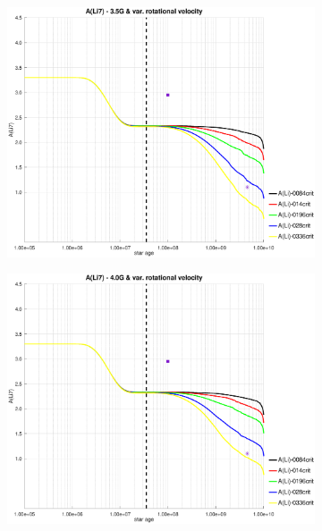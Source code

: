 \documentclass[fleqn,usenatbib]{mnras}
\begin{document}
\begin{figure}
\begin{subfigure}[h]{0.47\textwidth}
    \label{fig:subim2}
    \end{subfigure}
    \begin{subfigure}[h]{0.47\textwidth}
    \includegraphics[trim = 35mm 15mm 20mm 15mm, clip,width=\textwidth]{figures/li_var_vel_3_5g.eps}
    \label{fig:subim3}
    \end{subfigure}
    \begin{subfigure}[h]{0.47\textwidth}
    \includegraphics[trim = 35mm 15mm 20mm 15mm, clip,width=\textwidth]{figures/li_var_vel_4_0g.eps}
    \label{fig:subim4}
    \end{subfigure}

\end{figure}
\end{document}
